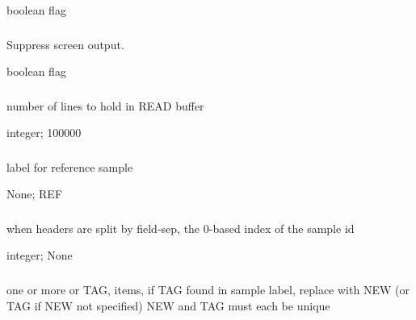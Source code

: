 \documentclass[letterpaper,11pt,english]{sphinxmanual}
\begin{document}
 boolean flag


\subsubsection{}
\label{\detokenize{prog_desc:id6}}
 Suppress screen output.

 boolean flag


\subsubsection{}
\label{\detokenize{prog_desc:read-buffer-readbuffer}}
 number of lines to hold in READ buffer

 integer;  100000


\subsubsection{}
\label{\detokenize{prog_desc:ref-label-reflabel}}
 label for reference sample

 None;  REF


\subsubsection{}
\label{\detokenize{prog_desc:sample-field-samplefield}}
 when headers are split by \textendash{}field-sep, the 0-based index of the sample id

 integer;  None


\subsubsection{}
\label{\detokenize{prog_desc:sample-replace-samplereplace}}
 one or more  or TAG, items, if TAG found in sample label, replace with NEW (or TAG if NEW not specified) NEW and TAG must each be unique
\end{document}
